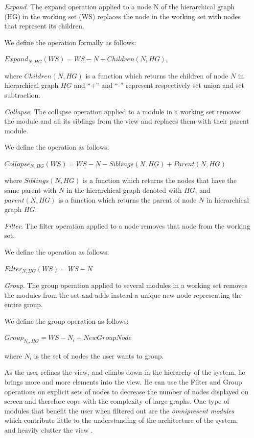 \documentclass[preprint,12pt]{elsarticle}
\begin{document}
\begin{description}

\item {\em Expand}. The expand operation applied to a node N of the hierarchical graph (HG) in the working set (WS) replaces the node in the working set with nodes that represent its children. 

We define the operation formally as follows: 

$ Expand_{N,HG} (WS) = WS - N + Children (N, HG)$, 

where $Children(N,HG)$ is a function which returns the children of node $N$ in hierarchical graph $HG$ and ``+'' and ``-'' represent respectively set union and set subtraction.

\item {\em Collapse}. The collapse operation applied to a module in a working set removes the module and all its siblings from the view and replaces them with their parent module. 

We define the operation as follows:

$ Collapse_{N,HG} (WS) = WS - N - Siblings (N, HG) + Parent (N, HG)$

where $Siblings(N, HG)$ is a function which returns the nodes that have the same parent with $N$ in the hierarchical graph denoted with $HG$, and $parent(N,HG)$ is a function which returns the parent of node $N$ in hierarchical graph $HG$. 

\item {\em Filter}. The filter operation applied to a node removes that node from the working set. 

We define the operation as follows:

$ Filter_{N,HG} (WS) = WS - N$

\item {\em Group}. The group operation applied to several modules in a working set removes the modules from the set and adds instead a unique new node representing the entire group. 

We define the group operation as follows: 

$ Group_{N_{i},HG} = WS - N_i + NewGroupNode $

where $N_i$ is the set of nodes the user wants to group.

\end{description}

As the user refines the view, and climbs down in the hierarchy of the system, he brings more and more elements into the view. He can use the Filter and Group operations on explicit sets of nodes to decrease the number of nodes displayed on screen and therefore cope with the complexity of large graphs. One type of modules that benefit the user when filtered out are the {\em omnipresent modules} which contribute little to the understanding of the architecture of the system, and heavily clutter the view \cite{mitchell-bunch}.
\end{document}
